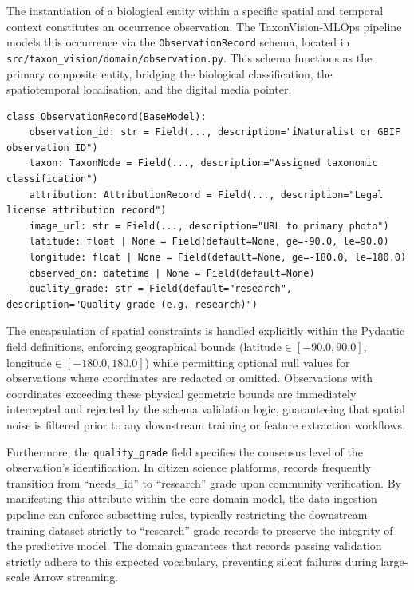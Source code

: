 The instantiation of a biological entity within a specific spatial and temporal context constitutes an occurrence observation. The TaxonVision-MLOps pipeline models this occurrence via the \texttt{ObservationRecord} schema, located in \texttt{src/taxon\_vision/domain/observation.py}. This schema functions as the primary composite entity, bridging the biological classification, the spatiotemporal localisation, and the digital media pointer.

\begin{verbatim}
class ObservationRecord(BaseModel):
    observation_id: str = Field(..., description="iNaturalist or GBIF observation ID")
    taxon: TaxonNode = Field(..., description="Assigned taxonomic classification")
    attribution: AttributionRecord = Field(..., description="Legal license attribution record")
    image_url: str = Field(..., description="URL to primary photo")
    latitude: float | None = Field(default=None, ge=-90.0, le=90.0)
    longitude: float | None = Field(default=None, ge=-180.0, le=180.0)
    observed_on: datetime | None = Field(default=None)
    quality_grade: str = Field(default="research", description="Quality grade (e.g. research)")
\end{verbatim}

The encapsulation of spatial constraints is handled explicitly within the Pydantic field definitions, enforcing geographical bounds ($\text{latitude} \in [-90.0, 90.0]$, $\text{longitude} \in [-180.0, 180.0]$) while permitting optional null values for observations where coordinates are redacted or omitted. Observations with coordinates exceeding these physical geometric bounds are immediately intercepted and rejected by the schema validation logic, guaranteeing that spatial noise is filtered prior to any downstream training or feature extraction workflows.

Furthermore, the \texttt{quality\_grade} field specifies the consensus level of the observation's identification. In citizen science platforms, records frequently transition from ``needs\_id'' to ``research'' grade upon community verification. By manifesting this attribute within the core domain model, the data ingestion pipeline can enforce subsetting rules, typically restricting the downstream training dataset strictly to ``research'' grade records to preserve the integrity of the predictive model. The domain guarantees that records passing validation strictly adhere to this expected vocabulary, preventing silent failures during large-scale Arrow streaming.

